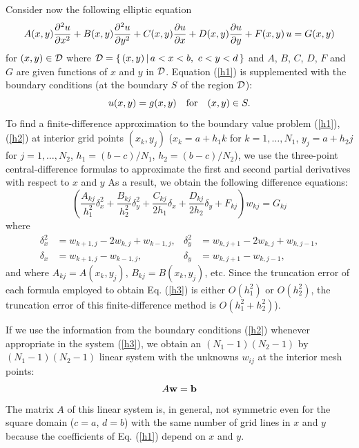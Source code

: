 Consider now the following elliptic equation
\begin{equation}
A(x,y)\frac{{\partial}^2 u}{{\partial} x^2}+B(x,y)\frac{{\partial}^2 u}{{\partial} y^2}+
C(x,y)\frac{{\partial} u}{{\partial} x}+D(x,y)\frac{{\partial} u}{{\partial} y}+F(x,y) \, u = G(x,y)
\label{h1}
\end{equation}
for $(x,y)\in{\cal D}$ where ${\cal D}=\{\, (x,y)\, \vert \,  a<x<b, \ c<y<d \, \}$ and
$A$, $B$, $C$, $D$, $F$ and $G$ are given functions of $x$ and $y$ in ${\cal D}$.
Equation (\ref{h1}) is supplemented with
the boundary conditions (at the boundary $S$ of the region ${\cal D}$):
\begin{equation}
u(x,y) = g(x,y) \quad \hbox{for} \quad (x,y)\in S.   \label{h2}
\end{equation}
To find a finite-difference approximation to the boundary value problem
(\ref{h1}), (\ref{h2}) at interior grid points $(x_{k},y_{j})$ ($x_{k}=a+h_{1}k$ for
$k=1,\dots,N_{1}$, $y_{j}=a+h_{2}j$ for
$j=1,\dots,N_{2}$, $h_{1}=(b-c)/N_{1}$, $h_{2}=(b-c)/N_{2}$), we use
the three-point central-difference formulas
to approximate the first and second partial derivatives with respect to $x$ and $y$
As a result, we obtain the following
difference equations:
\begin{equation}
\left(\frac{A_{kj}}{h_{1}^2}\delta_{x}^2+
\frac{B_{kj}}{h_{2}^2}\delta_{y}^2+ \frac{C_{kj}}{2h_{1}}\delta_{x}+
\frac{D_{kj}}{2h_{2}}\delta_{y}+F_{kj}\right)w_{kj}=G_{kj} \label{h3}
\end{equation}
where
\begin{align*}
\delta_{x}^2&=w_{k+1,j}-2w_{k,j}+w_{k-1,j}, &
\delta_{y}^2&=w_{k,j+1}-2w_{k,j}+w_{k,j-1}, \\
\delta_{x}&=w_{k+1,j}-w_{k-1,j}, &
\delta_{y}&=w_{k,j+1}-w_{k,j-1},
\end{align*}
and where $A_{kj}=A(x_{k},y_{j})$, $B_{kj}=B(x_{k},y_{j})$, etc.
Since the truncation error of each formula employed to obtain Eq. (\ref{h3})
is either $O(h_{1}^{2})$ or $O(h_{2}^{2})$, the truncation error of
this finite-difference method is $O(h_{1}^{2}+h_{2}^{2})$).

\vskip 0.3cm
 
If we use the information from the boundary conditions (\ref{h2})
whenever appropriate in the system (\ref{h3}), we obtain an
$(N_{1}-1)(N_{2}-1)$ by $(N_{1}-1)(N_{2}-1)$ linear system with
the unknowns $w_{ij}$ at the interior mesh points:
\[
A{\bf w}={\bf b}
\]
The matrix $A$ of this linear system is, in general, not symmetric even for
the square domain ($c=a$, $d=b$) with the same number of grid lines in $x$ and
$y$ because the coefficients of Eq. (\ref{h1}) depend on $x$ and $y$.

